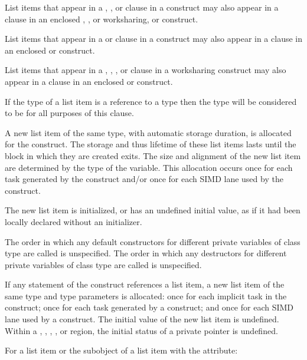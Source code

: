List items that appear in a , , or  clause in a 
 construct may also appear in a  clause in an enclosed , 
, or worksharing, or  construct. 

List items that appear in a  or  clause in a  construct 
may also appear in a  clause in an enclosed  or  construct. 

List items that appear in a , , , or 
 clause in a worksharing construct may also appear in a  clause 
in an enclosed  or  construct. 

\ccppspecificstart
If the type of a list item is a reference to a type  then the type will be considered to be 
 for all purposes of this clause.

A new list item of the same type, with automatic storage duration, is allocated for the 
construct. The storage and thus lifetime of these list items lasts until the block in which 
they are created exits. The size and alignment of the new list item are determined by the 
type of the variable. This allocation occurs once for each task generated by the construct 
and/or once for each SIMD lane used by the construct.

The new list item is initialized, or has an undefined initial value, as if it had been locally 
declared without an initializer. 
\ccppspecificend

\cppspecificstart
The order in which any default constructors for different private variables of class type 
are called is unspecified. The order in which any destructors for different private 
variables of class type are called is unspecified.
\cppspecificend

\fortranspecificstart
If any statement of the construct references a list item, a new list item of the same type 
and type parameters is allocated: once for each implicit task in the  
construct; once for each task generated by a  construct; and once for each SIMD 
lane used by a  construct. The initial value of the new list item is undefined. 
Within a , , , , or  region, the initial status 
of a private pointer is undefined.

For a list item or the subobject of a list item with the  attribute:

